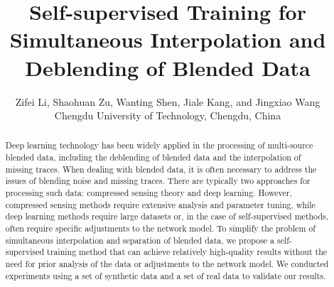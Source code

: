 \documentclass{segabs}
\begin{document}
\title{Self-supervised Training for Simultaneous Interpolation and Deblending of Blended Data}

\renewcommand{\thefootnote}{\fnsymbol{footnote}} 

\author{
Zifei Li\footnotemark[2]\footnotemark[1],
Shaohuan Zu\footnotemark[2], 
Wanting Shen\footnotemark[2],
Jiale Kang\footnotemark[2],
and
Jingxiao Wang\footnotemark[2]
\\
\footnotemark[2]Chengdu University of Technology, Chengdu, China
}


\maketitle

\begin{abstract}
Deep learning technology has been widely applied in the processing of multi-source blended data, including the deblending of blended data and the interpolation of missing traces. When dealing with blended data, it is often necessary to address the issues of blending noise and missing traces. There are typically two approaches for processing such data: compressed sensing theory and deep learning. However, compressed sensing methods require extensive analysis and parameter tuning, while deep learning methods require large datasets or, in the case of self-supervised methods, often require specific adjustments to the network model. To simplify the problem of simultaneous interpolation and separation of blended data, we propose a self-supervised training method that can achieve relatively high-quality results without the need for prior analysis of the data or adjustments to the network model. We conducted experiments using a set of synthetic data and a set of real data to validate our results.%

\end{abstract}
\end{document}
